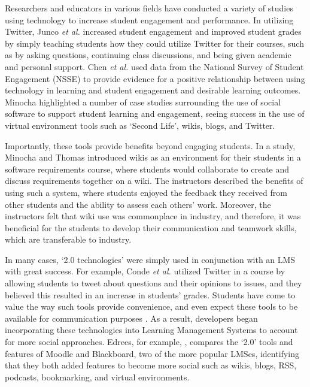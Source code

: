 Researchers and educators in various fields have conducted a variety of studies using technology to increase student engagement and performance. In utilizing Twitter, Junco \textit{et al.} \cite{junco2011effect} increased student engagement and improved student grades by simply teaching students how they could utilize Twitter for their courses, such as by asking questions, continuing class discussions, and being given academic and personal support. Chen \textit{et al.} \cite{chen2010engaging} used data from the National Survey of Student Engagement (NSSE) to provide evidence for a positive relationship between using technology in learning and student engagement and desirable learning outcomes. Minocha \cite{minocha2009study} highlighted a number of case studies surrounding the use of social software to support student learning and engagement, seeing success in the use of virtual environment tools such as `Second Life', wikis, blogs, and Twitter.

Importantly, these tools provide benefits beyond engaging students. In a study, Minocha and Thomas \cite{minocha2007collaborative} introduced wikis as an environment for their students in a software requirements course, where students would collaborate to create and discuss requirements together on a wiki. The instructors described the benefits of using such a system, where students enjoyed the feedback they received from other students and the ability to assess each others' work. Moreover, the instructors felt that wiki use was commonplace in industry, and therefore, it was beneficial for the students to develop their communication and teamwork skills, which are transferable to industry.

In many cases, `2.0 technologies' were simply used in conjunction with an LMS with great success. For example, Conde \textit{et al.} \cite{conde2014evolving} utilized Twitter in a course by allowing students to tweet about questions and their opinions to issues, and they believed this resulted in an increase in students' grades. Students have come to value the way such tools provide convenience, and even expect these tools to be available for communication purposes \cite{caruso2007ecar}. As a result, developers began incorporating these technologies into Learning Management Systems to account for more social approaches. Edrees, for example, \cite{edrees2013elearning}, compares the `2.0' tools and features of Moodle and Blackboard, two of the more popular LMSes, identifying that they both added features to become more social such as wikis, blogs, RSS, podcasts, bookmarking, and virtual environments.

